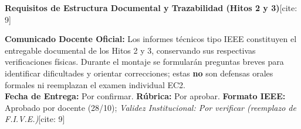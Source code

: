 \documentclass[10pt, a4paper]{article}
\begin{document}
\begin{center}
    {\Large\textbf{\textcolor{ucbblue}{Requisitos de Estructura Documental y Trazabilidad (Hitos 2 y 3)}}}[cite: 9]
\end{center}

\begin{tcolorbox}[colback=white, colframe=black, boxsep=1pt, top=2pt, bottom=2pt]
    \footnotesize\raggedright
    \textbf{Comunicado Docente Oficial:} Los informes técnicos tipo IEEE constituyen el entregable documental de los Hitos 2 y 3, conservando sus respectivas verificaciones físicas. Durante el montaje se formularán preguntas breves para identificar dificultades y orientar correcciones; estas \textbf{no} son defensas orales formales ni reemplazan el examen individual EC2.\\[0.1cm]
    \textbf{Fecha de Entrega:} Por confirmar. \quad \textbf{Rúbrica:} Por aprobar. \quad \textbf{Formato IEEE:} Aprobado por docente (28/10); \textit{Validez Institucional: Por verificar (reemplazo de F.I.V.E.)}[cite: 9]
\end{tcolorbox}
\end{document}
